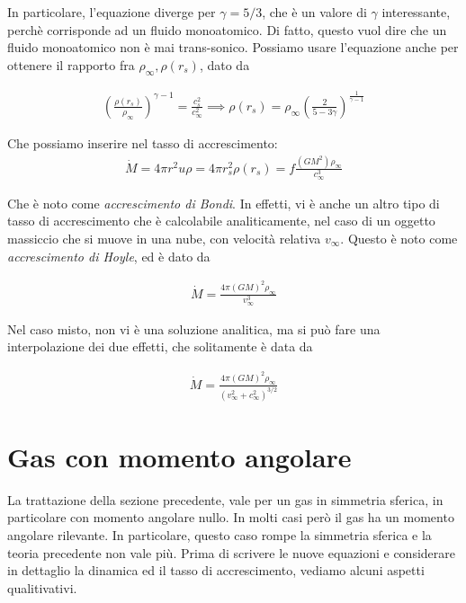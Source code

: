 \documentclass{report}
\begin{document}
In particolare, l'equazione diverge per \(\gamma = 5/3\), che è un valore di \(\gamma\) interessante, perchè corrisponde ad un fluido monoatomico. Di fatto, questo vuol dire che un fluido monoatomico non è mai trans-sonico. Possiamo usare l'equazione anche per ottenere il rapporto fra \(\rho_\infty, \rho(r_s)\), dato da 

\begin{align}
    \left(\frac{\rho(r_s)}{\rho_\infty}\right)^{\gamma -1} = \frac{c_s^2}{c_\infty^2} \implies \rho(r_s) = \rho_\infty \left(\frac{2}{5-3\gamma}\right)^{\frac{1}{\gamma -1}}
\end{align}

Che possiamo inserire nel tasso di accrescimento: 
\begin{align}
    \dot{M} = 4\pi r^2 u \rho = 4\pi r_s^2 \rho(r_s) = f \frac{(GM^2)\rho_{\infty}}{c^3_{\infty}}
\end{align}


Che è noto come \emph{accrescimento di Bondi}. In effetti, vi è anche un altro tipo di tasso di accrescimento che è calcolabile analiticamente, nel caso di un oggetto massiccio che si muove in una nube, con velocità relativa \(v_\infty\). Questo è noto come \emph{accrescimento di Hoyle}, ed è dato da

\begin{align}
    \dot{M} = \frac{4\pi (GM)^2\rho_\infty}{v_\infty^3}
\end{align}

Nel caso misto, non vi è una soluzione analitica, ma si può fare una interpolazione dei due effetti, che solitamente è data da 

\begin{align}
    \dot{M} = \frac{4\pi (GM)^2\rho_\infty}{(v_\infty^2 + c_\infty^2)^{3/2}}
\end{align}

\section{Gas con momento angolare}

La trattazione della sezione precedente, vale per un gas in simmetria sferica, in particolare con momento angolare nullo. In molti casi però il gas ha un momento angolare rilevante. In particolare, questo caso rompe la simmetria sferica e la teoria precedente non vale più. Prima di scrivere le nuove equazioni e considerare in dettaglio la dinamica ed il tasso di accrescimento, vediamo alcuni aspetti qualitivativi. 
\end{document}
